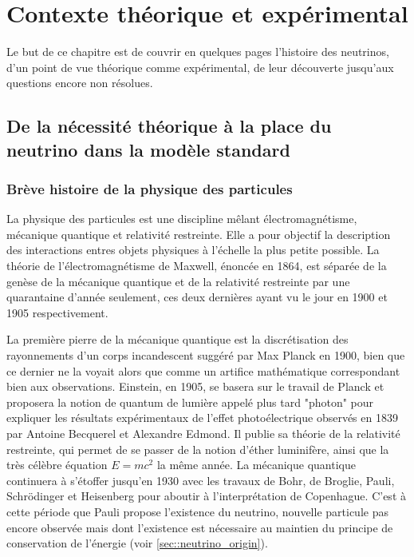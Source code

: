 \chapter{Contexte théorique et expérimental}
    
    Le but de ce chapitre est de couvrir en quelques pages l'histoire des neutrinos, d'un point de vue théorique comme expérimental, de leur découverte jusqu'aux questions encore non résolues.
    
    \section{De la nécessité théorique à la place du neutrino dans la modèle standard}
    
	    \subsection{Brève histoire de la physique des particules}
	    
		    La physique des particules est une discipline mêlant électromagnétisme, mécanique quantique et relativité restreinte. Elle a pour objectif la description des interactions entres objets physiques à l'échelle la plus petite possible. La théorie de l'électromagnétisme de Maxwell, énoncée en 1864\cite{Maxwell1865}, est séparée de la genèse de la mécanique quantique et de la relativité restreinte par une quarantaine d'année seulement, ces deux dernières ayant vu le jour en 1900 et 1905 respectivement. 
		    
		    La première pierre de la mécanique quantique est la discrétisation des rayonnements d'un corps incandescent suggéré par Max Planck en 1900\cite{Planck1900}, bien que ce dernier ne la voyait alors que comme un artifice mathématique correspondant bien aux observations. Einstein, en 1905\cite{Einstein1905-quanta}, se basera sur le travail de Planck et proposera la notion de quantum de lumière appelé plus tard "photon" pour expliquer les résultats expérimentaux de l'effet photoélectrique observés en 1839 par Antoine Becquerel et Alexandre Edmond\cite{Becquerel1839}. Il publie sa théorie de la relativité restreinte\cite{Einstein1905-relat}, qui permet de se passer de la notion d'éther luminifère, ainsi que la très célèbre équation $E=mc^2$\cite{Einstein1905-emc2} la même année. La mécanique quantique continuera à s'étoffer jusqu'en 1930 avec les travaux de Bohr, de Broglie, Pauli, Schrödinger et Heisenberg pour aboutir à l'interprétation de Copenhague\cite{Heisenberg1949}. C'est à cette période que Pauli propose l'existence du neutrino\cite{Pauli1930}, nouvelle particule pas encore observée mais dont l'existence est nécessaire au maintien du principe de conservation de l'énergie (voir \autoref{sec::neutrino_origin}).
		    
